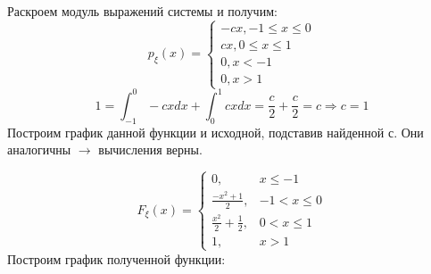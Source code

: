 Раскроем модуль выражений системы и получим:
\[
p_{\xi}(x) =
\begin{cases}
	-cx, -1 \le x \le 0 \\
	cx, 0 \le x \le 1 \\
	0, x < -1 \\
	0, x > 1
\end{cases}
\]
\[ 1 = \int_{-1}^{0} -cx dx + \int_{0}^{1} cx dx = \frac{c}{2} + \frac{c}{2} = c \Rightarrow c = 1 \]
Построим график данной функции и исходной, подставив найденной $с$. Они аналогичны $\to$ вычисления верны.
\begin{figure}[H]
\end{figure}

\[
F_{\xi}(x) =
\begin{cases}
	0, &x \le -1 \\
	\frac{-x^2 + 1}{2}, &-1 < x \le 0 \\
	\frac{x^2}{2} + \frac{1}{2}, &0 < x \le 1 \\
	1, &x > 1
\end{cases}
\]
Построим график полученной функции:
\begin{figure}[H]
\end{figure}

